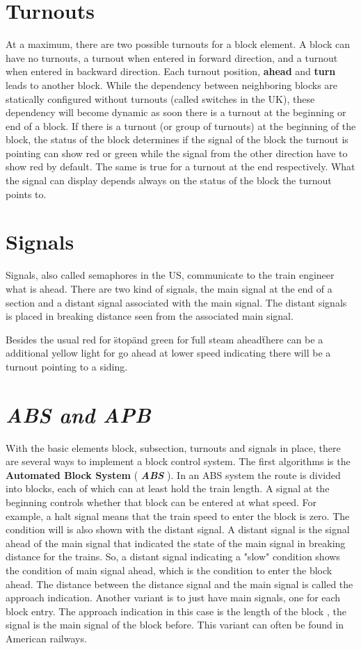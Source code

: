 \section{Turnouts}

At a maximum, there are two possible turnouts for a block element. A block can have no turnouts, a turnout when entered in forward direction, and a turnout when entered in backward direction. Each turnout position, \textbf{ahead} and \textbf{turn} leads to another block. While the dependency between neighboring blocks are statically configured without turnouts (called switches in the UK), these dependency will become dynamic as soon there is a turnout at the beginning or end of a block. If there is a turnout (or group of turnouts) at the beginning of the block, the status of the block determines if the signal of the block the turnout is pointing can show red or green while the signal from the other direction have to show red by default. The same is true for a turnout at the end respectively. What the signal can display depends always on the status of the block the turnout points to.

\section{Signals}

Signals, also called semaphores in the US, communicate to the train engineer what is ahead. There are two kind of signals, the main signal at the end of a section and a distant signal associated with the main signal. The distant signals is placed in breaking distance seen from the associated main signal. 

Besides the usual red for \"stop\" and green for \"full steam ahead\" there can be a additional yellow light for go ahead at lower speed indicating there will be a turnout pointing to a siding.

\section{\textit{ABS and APB}}

With the basic elements  block, subsection, turnouts and signals in place, there are several ways to implement a block control system. The first algorithms is the \textbf{Automated Block System} ( \textbf{\textit{ABS}} ). In an ABS system the route is divided into blocks, each of which can at least hold the train length. A signal at the beginning controls whether that block can be entered at what speed. For example, a halt signal means that the train speed to enter the block is zero. The condition will is also shown with the distant signal. A distant signal is the signal ahead of the main signal that indicated the state of the main signal in breaking distance for the trains. So, a distant signal indicating a "slow" condition shows the condition of main signal ahead, which is the condition to enter the block ahead. The distance between the distance signal and the main signal is called the approach indication. Another variant is to just have main signals, one for each block entry. The approach indication in this case is the length of the block , the signal is the main signal of the block before. This variant can often be found in American railways.

